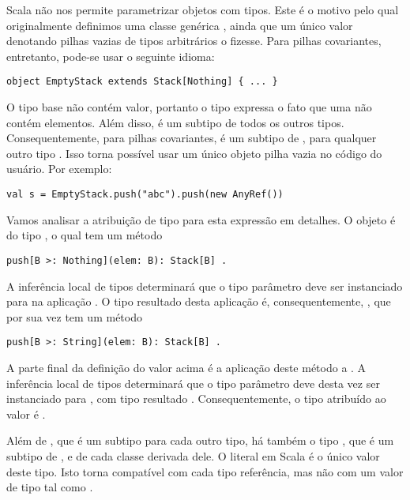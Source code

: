 Scala não nos permite parametrizar objetos com tipos. Este é o motivo 
pelo qual originalmente definimos uma classe genérica , 
ainda que um único valor denotando pilhas vazias de tipos arbitrários o 
fizesse. Para pilhas covariantes, entretanto, pode-se usar o seguinte idioma:

\begin{lstlisting}
object EmptyStack extends Stack[Nothing] { ... }
\end{lstlisting}

O tipo base  não contém valor, portanto o tipo 
expressa o fato que uma  não contém elementos. Além disso, 
 é um subtipo de todos os outros tipos. Consequentemente, para 
pilhas covariantes,  é um subtipo de , para 
qualquer outro tipo . Isso torna possível usar um único objeto pilha vazia
no código do usuário. Por exemplo:

\begin{lstlisting}
val s = EmptyStack.push("abc").push(new AnyRef())
\end{lstlisting}
Vamos analisar a atribuição de tipo para esta expressão em detalhes. 
O objeto  é do tipo , o qual tem um método 
\begin{lstlisting}
push[B >: Nothing](elem: B): Stack[B] .
\end{lstlisting}
A inferência local de tipos determinará que o tipo parâmetro  deve ser
instanciado para  na aplicação . O tipo resultado
desta aplicação é, consequentemente, , que por sua vez tem um método  
\begin{lstlisting}
push[B >: String](elem: B): Stack[B] .
\end{lstlisting}

A parte final da definição do valor acima é a aplicação deste método a .
A inferência local de tipos determinará que o tipo parâmetro  deve desta vez
ser instanciado para , com tipo resultado . 
Consequentemente, o tipo atribuído ao valor  é .

Além de , que é um subtipo para cada outro tipo, há também o tipo ,
que é um subtipo de , e de cada classe derivada dele. O literal 
em Scala é o único valor deste tipo. Isto torna  compatível com cada tipo referência, 
mas não com um valor de tipo tal como .  

